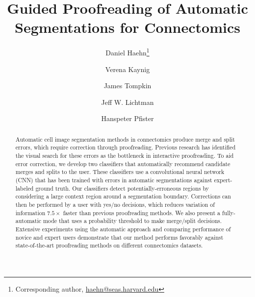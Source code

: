 \documentclass[10pt,twocolumn,letterpaper]{article}
\begin{document}
\title{Guided Proofreading of Automatic Segmentations for Connectomics}

\author[1,2]{Daniel Haehn\thanks{Corresponding author,  \url{haehn@seas.harvard.edu}}}
\author[1,2]{Verena Kaynig}
\author[3]{James Tompkin}
\author[2]{Jeff W. Lichtman}
\author[1,2]{Hanspeter Pfister}


\maketitle

\begin{abstract}
%
Automatic cell image segmentation methods in connectomics produce merge and
split errors, which require correction through proofreading. Previous research
has identified the visual search for these errors as the bottleneck in
interactive proofreading. To aid error correction, we develop two classifiers
that automatically recommend candidate merges and splits to the user. These
classifiers use a convolutional neural network (CNN) that has been trained with
errors in automatic segmentations against expert-labeled ground truth. Our
classifiers detect potentially-erroneous regions by considering a large context
region around a segmentation boundary. Corrections can then be performed by a
user with yes/no decisions, which reduces variation of information $7.5\times$ faster than previous
proofreading methods. We also present a fully-automatic mode that uses a
probability threshold to make merge/split decisions. Extensive experiments using
the automatic approach and comparing performance of novice and expert users
demonstrate that our method performs favorably against state-of-the-art
proofreading methods on different connectomics datasets.
%
\end{abstract}














{\small


}
\end{document}
